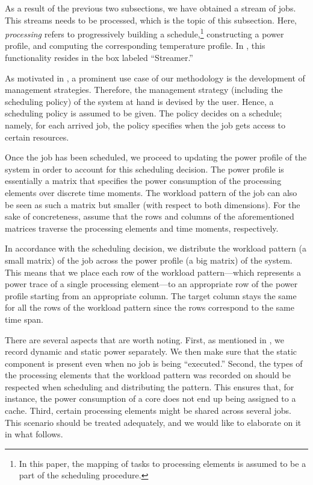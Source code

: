 As a result of the previous two subsections, we have obtained a stream of jobs.
This streams needs to be processed, which is the topic of this subsection. Here,
\emph{processing} refers to progressively building a schedule,\footnote{In this
paper, the mapping of tasks to processing elements is assumed to be a part of
the scheduling procedure.} constructing a power profile, and computing the
corresponding temperature profile. In , this functionality
resides in the box labeled ``Streamer.''

As motivated in , a prominent use case of our methodology is
the development of management strategies. Therefore, the management strategy
(including the scheduling policy) of the system at hand is devised by the user.
Hence, a scheduling policy is assumed to be given. The policy decides on a
schedule; namely, for each arrived job, the policy specifies when the job gets
access to certain resources.

Once the job has been scheduled, we proceed to updating the power profile of the
system in order to account for this scheduling decision. The power profile is
essentially a matrix that specifies the power consumption of the processing
elements over discrete time moments. The workload pattern of the job can also be
seen as such a matrix but smaller (with respect to both dimensions). For the
sake of concreteness, assume that the rows and columns of the aforementioned
matrices traverse the processing elements and time moments, respectively.

In accordance with the scheduling decision, we distribute the workload pattern
(a small matrix) of the job across the power profile (a big matrix) of the
system. This means that we place each row of the workload pattern---which
represents a power trace of a single processing element---to an appropriate row
of the power profile starting from an appropriate column. The target column
stays the same for all the rows of the workload pattern since the rows
correspond to the same time span.

There are several aspects that are worth noting. First, as mentioned in
, we record dynamic and static power separately. We then make
sure that the static component is present even when no job is being
``executed.'' Second, the types of the processing elements that the workload
pattern was recorded on should be respected when scheduling and distributing the
pattern. This ensures that, for instance, the power consumption of a core does
not end up being assigned to a cache. Third, certain processing elements might
be shared across several jobs. This scenario should be treated adequately, and
we would like to elaborate on it in what follows.


